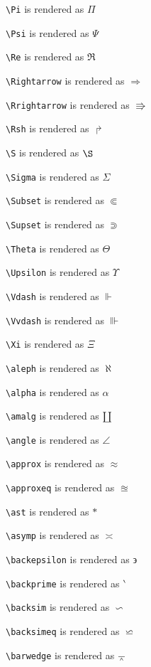 \texttt{\textbackslash Pi} is rendered as $\Pi$

\texttt{\textbackslash Psi} is rendered as $\Psi$

\texttt{\textbackslash Re} is rendered as $\Re$

\texttt{\textbackslash Rightarrow} is rendered as $\Rightarrow$

\texttt{\textbackslash Rrightarrow} is rendered as $\Rrightarrow$

\texttt{\textbackslash Rsh} is rendered as $\Rsh$

\texttt{\textbackslash S} is rendered as $\S$

\texttt{\textbackslash Sigma} is rendered as $\Sigma$

\texttt{\textbackslash Subset} is rendered as $\Subset$

\texttt{\textbackslash Supset} is rendered as $\Supset$

\texttt{\textbackslash Theta} is rendered as $\Theta$

\texttt{\textbackslash Upsilon} is rendered as $\Upsilon$

\texttt{\textbackslash Vdash} is rendered as $\Vdash$

\texttt{\textbackslash Vvdash} is rendered as $\Vvdash$

\texttt{\textbackslash Xi} is rendered as $\Xi$

\texttt{\textbackslash aleph} is rendered as $\aleph$

\texttt{\textbackslash alpha} is rendered as $\alpha$

\texttt{\textbackslash amalg} is rendered as $\amalg$

\texttt{\textbackslash angle} is rendered as $\angle$

\texttt{\textbackslash approx} is rendered as $\approx$

\texttt{\textbackslash approxeq} is rendered as $\approxeq$

\texttt{\textbackslash ast} is rendered as $\ast$

\texttt{\textbackslash asymp} is rendered as $\asymp$

\texttt{\textbackslash backepsilon} is rendered as $\backepsilon$

\texttt{\textbackslash backprime} is rendered as $\backprime$

\texttt{\textbackslash backsim} is rendered as $\backsim$

\texttt{\textbackslash backsimeq} is rendered as $\backsimeq$

\texttt{\textbackslash barwedge} is rendered as $\barwedge$

